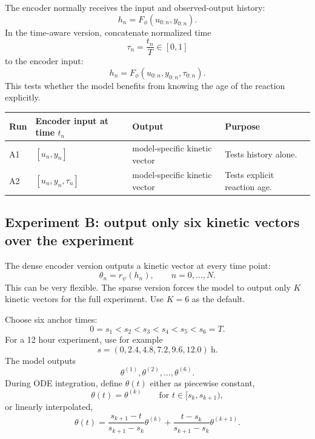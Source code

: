 \documentclass[11pt]{article}
\begin{document}
The encoder normally receives the input and observed-output history:
\begin{equation}
    h_n = F_\phi\left(u_{0:n},y_{0:n}\right).
\end{equation}
In the time-aware version, concatenate normalized time
\begin{equation}
    \tau_n = \frac{t_n}{T}\in[0,1]
\end{equation}
to the encoder input:
\begin{equation}
    h_n = F_\phi\left(u_{0:n},y_{0:n},\tau_{0:n}\right).
\end{equation}
This tests whether the model benefits from knowing the age of the reaction explicitly.

\begin{center}
\begin{tabularx}{\textwidth}{lllX}
\toprule
Run & Encoder input at time $t_n$ & Output & Purpose \\
\midrule
A1 & $[u_n,y_n]$ & model-specific kinetic vector & Tests history alone. \\
A2 & $[u_n,y_n,\tau_n]$ & model-specific kinetic vector & Tests explicit reaction age. \\
\bottomrule
\end{tabularx}
\end{center}

\subsection{Experiment B: output only six kinetic vectors over the experiment}

The dense encoder version outputs a kinetic vector at every time point:
\begin{equation}
    \theta_n = r_\psi(h_n),
    \qquad n=0,\ldots,N.
\end{equation}
This can be very flexible. The sparse version forces the model to output only $K$ kinetic vectors for the full experiment. Use $K=6$ as the default.

Choose six anchor times:
\begin{equation}
    0=s_1<s_2<s_3<s_4<s_5<s_6=T.
\end{equation}
For a 12 hour experiment, use for example
\begin{equation}
    s=(0,2.4,4.8,7.2,9.6,12.0)\ \mathrm{h}.
\end{equation}
The model outputs
\begin{equation}
    \theta^{(1)},\theta^{(2)},\ldots,\theta^{(6)}.
\end{equation}
During ODE integration, define $\theta(t)$ either as piecewise constant,
\begin{equation}
    \theta(t)=\theta^{(k)}
    \qquad \text{for } t\in[s_k,s_{k+1}),
\end{equation}
or linearly interpolated,
\begin{equation}
    \theta(t)=
    \frac{s_{k+1}-t}{s_{k+1}-s_k}\theta^{(k)}
    +
    \frac{t-s_k}{s_{k+1}-s_k}\theta^{(k+1)}.
\end{equation}
\end{document}
